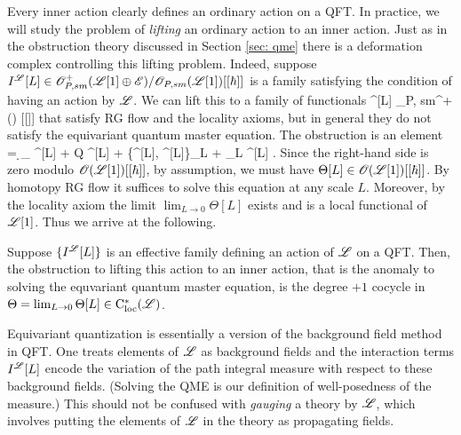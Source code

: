 Every inner action clearly defines an ordinary action on a QFT.
In practice, we will study the problem of {\em lifting} an ordinary action to an inner action. 
Just as in the obstruction theory discussed in Section \ref{sec: qme} there is a deformation complex controlling this lifting problem. 
Indeed, suppose $I^{\mathscr L}[L] \in \mathscr O_{P, sm}^+(\mathscr L[1] \oplus \mathscr E) / \mathscr O_{P,sm} (\mathscr L[1]) [[\hbar]]$ is a family satisfying the condition of having an action by $\mathscr L$. 
We can lift this to a family of functionals
\ben
{}^{\sL}[L] \in \sO_{P, sm}^+(\sL[1] \oplus \sE) [[\hbar]] 
\een
that satisfy RG flow and the locality axioms, but in general they do not satisfy the equivariant quantum master equation. 
The obstruction is an element 
\ben
\Theta[L] = \d_{\sL} ^{\sL}[L] + Q ^{\sL}[L] +  \{^{\sL}[L], ^{\sL}[L]\}_L + \hbar \Delta_L ^{\sL}[L]  .
\een
Since the right-hand side is zero modulo $\mathscr O(\mathscr L[1])[[\hbar]]$, by assumption, we must have $\Theta[L] \in \mathscr O(\mathscr L[1])[[\hbar]]$. 
By homotopy RG flow it suffices to solve this equation at any scale $L$.
Moreover, by the locality axiom the limit $\lim_{L \to 0} \Theta[L]$ exists and is a local functional of $\mathscr L[1]$. 
Thus we arrive at the following.

\begin{lem}\label{lem: innner action}
Suppose $\{I^{\mathscr L}[L]\}$ is an effective family defining an action of $\mathscr L$ on a QFT.
Then, the obstruction to lifting this action to an inner action, that is the anomaly to solving the equvariant quantum master equation, is the degree $+1$ cocycle in $\Theta = \lim_{L \to 0} \Theta[L] \in {\rm C}_{\rm loc}^*(\mathscr L)$. 
\end{lem}


\begin{rmk}
Equivariant quantization is essentially a version of the background field method in QFT.
One treats elements of $\mathscr L$ as background fields and 
the interaction terms $I^\mathscr L[L]$ encode the variation of the path integral measure with respect to these background fields.
(Solving the QME is our definition of well-posedness of the measure.)
This should not be confused with {\em gauging} a theory by $\mathscr L$, which involves putting the elements of $\mathscr L$ in the theory as propagating fields.
\end{rmk}